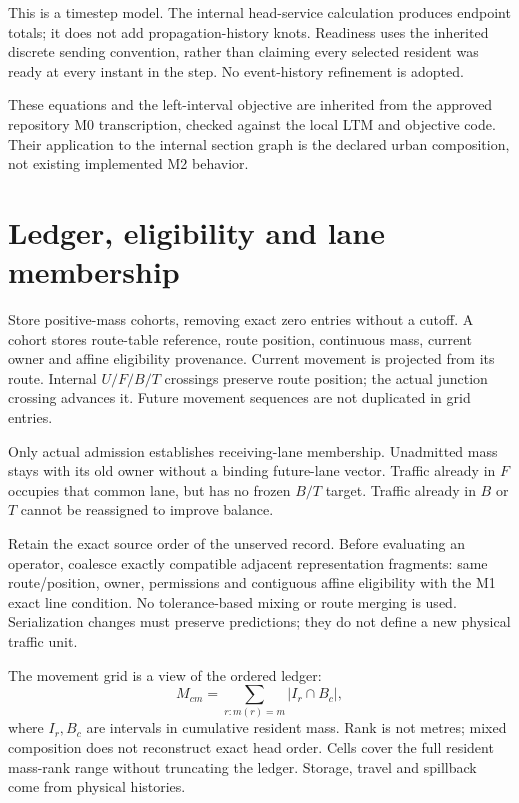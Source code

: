 \documentclass[10pt,a4paper]{article}
\begin{document}
This is a timestep model. The internal head-service calculation produces
endpoint totals; it does not add propagation-history knots.
Readiness uses the inherited discrete sending convention, rather than
claiming every selected resident was ready at every instant in the step.
No event-history refinement is adopted.

These equations and the left-interval objective are inherited from the
approved repository M0 transcription, checked against the local LTM and
objective code. Their application to the internal section graph is the
declared urban composition, not existing implemented M2 behavior.

\section{Ledger, eligibility and lane membership}

Store positive-mass cohorts, removing exact zero entries without a cutoff.
A cohort stores route-table reference, route position, continuous mass,
current owner and affine eligibility provenance. Current movement is
projected from its route. Internal $U/F/B/T$ crossings preserve route
position; the actual junction crossing advances it. Future movement
sequences are not duplicated in grid entries.

Only actual admission establishes receiving-lane membership. Unadmitted
mass stays with its old owner without a binding future-lane vector.
Traffic already in $F$ occupies that common lane, but has no frozen $B/T$
target. Traffic already in $B$ or $T$ cannot be reassigned to improve balance.

Retain the exact source order of the unserved record. Before evaluating
an operator, coalesce exactly compatible adjacent representation fragments:
same route/position, owner, permissions and contiguous affine eligibility
with the M1 exact line condition. No tolerance-based mixing or route
merging is used. Serialization changes must preserve predictions; they
do not define a new physical traffic unit.

The movement grid is a view of the ordered ledger:
\begin{equation}
 M_{cm}=\sum_{r:m(r)=m}|I_r\cap B_c|,
 \label{eq:grid}
\end{equation}
where $I_r,B_c$ are intervals in cumulative resident mass. Rank is not
metres; mixed composition does not reconstruct exact head order.
Cells cover the full resident mass-rank range without truncating the
ledger. Storage, travel and spillback come from physical histories.
\end{document}
